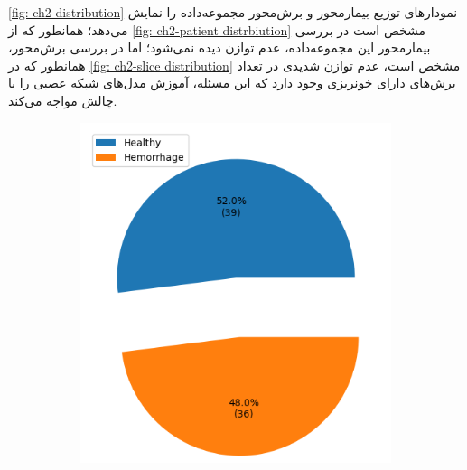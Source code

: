 \autoref{fig: ch2-distribution}
نمودارهای توزیع بیمارمحور و برش‌محور مجموعه‌داده را نمایش می‌دهد؛ همانطور که از ‎\autoref{fig: ch2-patient distrbiution}‎ مشخص است در بررسی بیمار‌محور این مجموعه‌داده، عدم توازن دیده نمی‌شود؛ اما در بررسی برش‌محور، همانطور که در ‎\autoref{fig: ch2-slice distribution}‎ 
مشخص است، عدم توازن شدیدی در تعداد برش‌های دارای خونریزی وجود دارد که این مسئله، آموزش مدل‌های شبکه عصبی را با چالش مواجه می‌کند.
 \begin{figure}[ht]
		\centering %
		\begin{subfigure}{0.45\textwidth}
			\includegraphics[width=\linewidth]{Images/Chapter2/patient distrbiution.png}
			\caption{}
			\label{fig: ch2-patient distrbiution}
		\end{subfigure}\hfil %
		\begin{subfigure}{0.45\textwidth}

\end{subfigure}
\end{figure}
